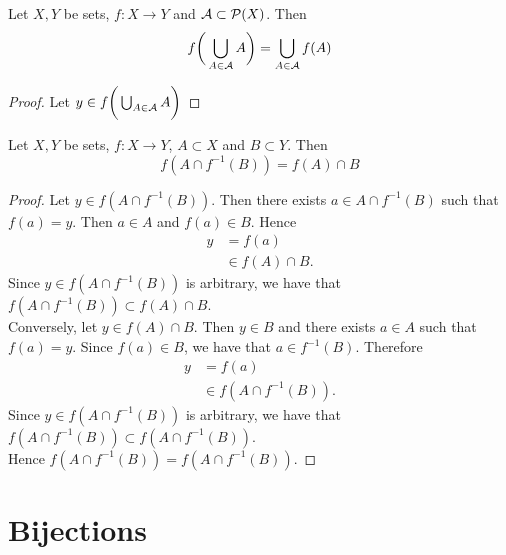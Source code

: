 \documentclass{book}
\begin{document}
		\begin{ex} 
			Let $X, Y$ be sets, $f:X \rightarrow Y$ and $\mathcal{A} \subset \mathcal{P}(X)$. Then 
			$$f\bigg( \bigcup_{A \in \mathcal{A}} A\bigg) = \bigcup_{A \in \mathcal{A}} f(A)$$ 
		\end{ex}
	
		\begin{proof}
			Let $y \in f\bigg( \bigcup_{A \in \mathcal{A}} A \bigg)$
		\end{proof}
	
		\begin{ex} 
			Let $X, Y$ be sets, $f:X \rightarrow Y$, $A \subset X$ and $B \subset Y$. Then 
			$$f(A \cap f^{-1}(B)) = f(A) \cap B$$ 
		\end{ex}
		
		\begin{proof}
			Let $y \in f(A \cap f^{-1}(B))$. Then there exists $a \in A \cap f^{-1}(B)$ such that $f(a) = y$. Then $a \in A$ and $f(a) \in B$. Hence 
			\begin{align*}
				y
				& = f(a) \\
				& \in f(A) \cap B.
			\end{align*}
			Since $y \in f(A \cap f^{-1}(B))$ is arbitrary, we have that $f(A \cap f^{-1}(B)) \subset f(A) \cap B$. \\
			Conversely, let $y \in f(A) \cap B$. Then $y \in B$ and there exists $a \in A$ such that $f(a) = y$. Since $f(a) \in B$, we have that $a \in f^{-1}(B)$. Therefore 
			\begin{align*}
				y
				& = f(a) \\
				& \in f(A \cap f^{-1}(B)).
			\end{align*} 
			Since $y \in f(A \cap f^{-1}(B))$ is arbitrary, we have that $f(A \cap f^{-1}(B)) \subset f(A \cap f^{-1}(B))$. \\
			Hence $f(A \cap f^{-1}(B)) = f(A \cap f^{-1}(B))$. 
		\end{proof}
	
		
		
	
	
	
	
	
	
	
	
	
	
	
	
	
	
	
	
	\section{Bijections}
	
\end{document}

